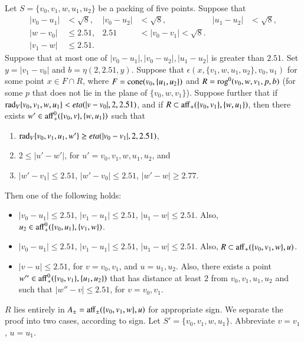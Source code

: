 \begin{tarskidata}
\begin{tarski}
\begin{lemma}
 Let $S=\{v_0,v_1,w,u_1,u_2\}$ be a packing of five points.
Suppose that 
   $$
   \begin{array}{rlrlrll}
   |v_0-u_1|&<\sqrt8,& |v_0-u_2|&<\sqrt8,& |u_1-u_2|&<\sqrt8,\\
   |w-v_0|&\le 2.51, &2.51&<|v_0-v_1|<\sqrt8.\\
   |v_1-w|&\le 2.51.
   \end{array}
   $$
Suppose that at most one of $|v_0-u_1|,|v_0-u_2|,|u_1-u_2|$ is
greater than $2.51$.
%
Set $y=|v_1-v_0|$ and $b=\eta(2,2.51,y)$.
Suppose that $\epsilon(x,\{v_1,w,u_1,u_2\},v_0,u_1)$ for some point
$x\in F\cap R$, where $F={\operatorname{cone}}(v_0,\{u_1,u_2\})$ and
$R={\operatorname{rog}}^0(v_0,w,v_1,p,b)$ (for some $p$ that
does not lie in the plane of $\{v_0,w,v_1\}$).
Suppose further 
that if $\operatorname{rad}_V\{v_0,v_1,w,u_1\} < eta(|v-v_0|,2,2.51)$, 
and if $R\subset {\operatorname{aff}}_+(\{v_0,v_1\},\{w,u_1\})$,
then there exists
$w'\in{\operatorname{aff}}_+^0(\{v_0,v\},\{w,u_1\})$ such that 
  \begin{enumerate}
  \item $\operatorname{rad}_V\{v_0,v_1,u_1,w'\} \ge eta(|v_0-v_1|,2,2.51)$, 
  \item $2\le |u'-w'|$, for $u'=v_0,v_1,w,u_1,u_2$, and
  \item $|w'-v_1|\le 2.51$, $|w'-v_0|\le 2.51$, $|w'-w|\ge 2.77$.
  \end{enumerate}
Then one of the following holds:
  \begin{itemize}
  \item $|v_0-u_1|\le 2.51$, $|v_1-u_1|\le 2.51$, $|u_1-w|\le 2.51$.
   Also, $u_2\in {\operatorname{aff}}_+^0(\{v_0,u_1\},\{v_1,w\})$.
  \item $|v_0-u_1|\le 2.51$, $|v_1-u_1|\le 2.51$, $|u_1-w|\le 2.51$.
  Also, $R\subset {\operatorname{aff}}_+(\{v_0,v_1,w\},u)$.
  \item $|v-u|\le 2.51$, for $v=v_0,v_1$, and $u=u_1,u_2$.  Also,
   there exists a point $w''\in{\operatorname{aff}}_+^0(\{v_0,v_1\},\{u_1,u_2\})$ 
   that has distance at least $2$ from
   $v_0,v_1,u_1,u_2$ and such that
   $|w''-v|\le 2.51$, for $v=v_0,v_1$.
  \end{itemize}
\end{lemma}

\begin{proved} $R$ lies entirely in
$A_\pm={\operatorname{aff}}_\pm(\{v_0,v_1,w\},u)$ for appropriate sign.
We separate the proof into two cases, according to sign.
Let $S'=\{v_0,v_1,w,u_1\}$.  Abbreviate $v=v_1$, $u=u_1$.


\end{proved}
\end{tarski}
\end{tarskidata}
